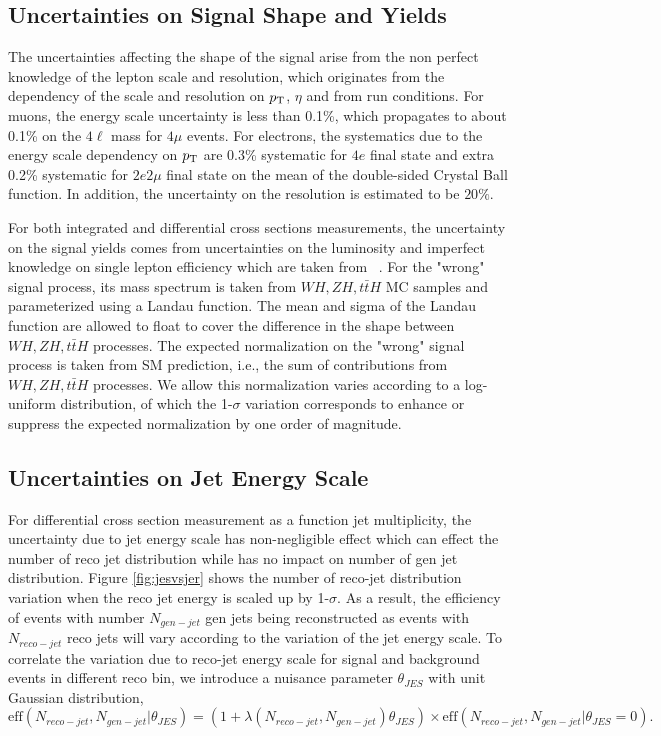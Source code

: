 \subsection{Uncertainties on Signal Shape and Yields}

The uncertainties affecting the shape of the signal arise from the non perfect knowledge of the lepton scale and resolution, which originates from 
the dependency of the scale and resolution on $p_{\rm T}$, $\eta$ and from run conditions. For muons, the energy scale uncertainty is less than
0.1\%, which propagates to about 0.1\% on the $4\ell$ mass for $4\mu$ events. For electrons, the systematics due to the energy scale dependency
on $p_{\rm T}$ are 0.3\% systematic for $4e$ final state and extra 0.2\% systematic for $2e2\mu$ final state on the mean of the double-sided Crystal
Ball function. In addition, the uncertainty on the resolution is estimated to be $20\%$.
\par
For both integrated and differential cross sections measurements, the uncertainty on the signal yields comes from uncertainties
on the luminosity
and imperfect knowledge on single lepton efficiency which are taken from ~\cite{Chatrchyan:2013mxa, Aad:2013xqa}. For the "wrong" signal process, its mass
spectrum is taken from $WH, ZH, t\bar{t}H$ MC samples and parameterized using a Landau function. The mean and sigma of the Landau function are allowed to
float to cover the difference in the shape between $WH, ZH, t\bar{t}H$ processes. The expected normalization on the "wrong" signal process is taken from
SM prediction, i.e., the sum of contributions from $WH, ZH, t\bar{t}H$ processes. We allow this normalization varies according to a log-uniform
distribution, of which the 1-$\sigma$ variation corresponds to enhance or suppress the expected normalization by one order of magnitude.

\subsection{Uncertainties on Jet Energy Scale}

For differential cross section measurement as a function jet multiplicity, the uncertainty due to jet energy scale has non-negligible effect which can effect 
the number of reco jet distribution while has no impact on number of gen jet distribution. Figure \ref{fig:jesvsjer} shows the number of 
reco-jet distribution variation when the reco jet energy is scaled up by 1-$\sigma$. As a result, the efficiency of events with number $N_{gen-jet}$ gen
jets being reconstructed as events with $N_{reco-jet}$ reco jets will vary according to the variation of the jet energy scale. To correlate the variation
due to reco-jet energy scale for signal and background events in different reco bin, we introduce a nuisance parameter $\theta_{JES}$ with unit Gaussian
distribution,
\begin{equation}
\mathrm{eff}(N_{reco-jet}, N_{gen-jet} | \theta_{JES}) = (1+\lambda(N_{reco-jet}, N_{gen-jet} )\theta_{JES})\times\mathrm{eff}(N_{reco-jet}, N_{gen-jet} | \theta_{JES}=0).
\end{equation}

